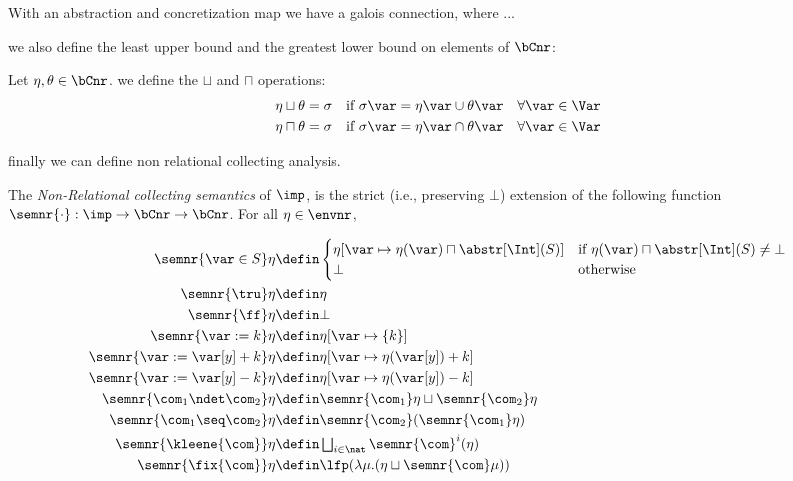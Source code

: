 With an abstraction and concretization map we have a galois
connection, where ...

we also define the least upper bound and the greatest lower bound on
elements of \(\bCnr\):

\begin{definition}
  Let \(\eta,\theta \in \bCnr\). we define the \(\sqcup\) and
  \(\sqcap\) operations:
  \begin{align*}
    \eta \sqcup \theta & = \sigma & \text{if } \sigma\var = \eta\var \cup \theta\var \quad \forall \var \in \Var \\
    \eta \sqcap \theta & = \sigma & \text{if } \sigma\var = \eta\var \cap \theta\var \quad \forall \var \in \Var \\
  \end{align*}
\end{definition}

finally we can define non relational collecting analysis.

\begin{definition}
  The \emph{Non-Relational collecting semantics} of \(\imp\), is the
  strict (i.e., preserving \(\bot\))
  extension of the following function \(\semnr{\cdot}: \imp \to
  \bCnr \to \bCnr\). For all \(\eta \in \envnr\),

  \begin{align*}
    \semnr{\var \in S}\eta 
    & \defin  
      \begin{cases}
        \eta[\var \mapsto \eta(\var)\sqcap \abstr[\Int](S)] & \text{if
                                                              }\eta(\var)\sqcap \abstr[\Int](S)\neq \bot \\ \bot &
                                                                                                                   \text{otherwise}
      \end{cases}\\
    \semnr{\tru}\eta 
    & \defin \eta\\
    \semnr{\ff}\eta 
    & \defin \bot\\
    \semnr{\var := k}\eta 
    & \defin \eta[\var \mapsto \{k\}]\\
    \semnr{\var := \var[y] + k}\eta 
    & \defin \eta[\var \mapsto \eta (\var[y]) + k]\\
    \semnr{\var := \var[y] - k}\eta 
    & \defin \eta[\var \mapsto \eta (\var[y]) - k]\\
    \semnr{\com_1 \ndet \com_2} \eta
    & \defin \semnr{\com_1} \eta \sqcup \semnr{\com_2} \eta\\
    \semnr{\com_1 \seq \com_2} \eta
    & \defin \semnr{\com_2} (\semnr{\com_1} \eta)\\
    \semnr{\kleene{\com}} \eta
    & \defin \textstyle \bigsqcup_{i \in \nat} \semnr{\com}^i (\eta)\\
    \semnr{\fix{\com}} \eta
    & \defin  \lfp(\lambda \mu. (\eta \sqcup \semnr{\com} \mu))
  \end{align*}
\end{definition}